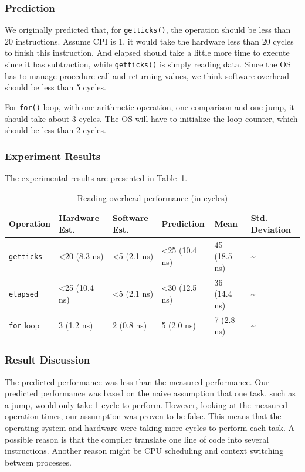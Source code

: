 \documentclass{article} %
\begin{document}
\subsubsection{Prediction}
We originally predicted that, for \texttt{getticks()}, the operation should be
less than 20 instructions. Assume CPI is 1, it would take the hardware less
than 20 cycles to finish this instruction. And elapsed should take a little
more time to execute since it has subtraction, while \texttt{getticks()} is
simply reading data. Since the OS has to manage procedure call and returning
values, we think software overhead should be less than 5 cycles.

For \texttt{for()} loop, with one arithmetic operation, one comparison and one
jump, it should take about 3 cycles. The OS will have to initialize the loop
counter, which should be less than 2 cycles.

\subsubsection{Experiment Results}

The experimental results are presented in Table~\ref{table:rdtsc_overhead}.

\begin{table}
  \caption{Reading overhead performance (in cycles)}
  \begin{tabular}{|l|l|l|l|l|l|}
    \hline
    Operation             & Hardware Est.         & Software Est.         & Prediction            & Mean          & Std. Deviation     \\ \hline
    \texttt{getticks}     & \textless20 (8.3 ns)  & \textless5 (2.1 ns)   & \textless25 (10.4 ns) & 45 (18.5 ns)  & \textasciitilde    \\ \hline
    \texttt{elapsed}      & \textless25 (10.4 ns) & \textless5 (2.1 ns)   & \textless30 (12.5 ns) & 36 (14.4 ns)  & \textasciitilde    \\ \hline
    \texttt{for} loop     & 3 (1.2 ns)            & 2 (0.8 ns)            & 5 (2.0 ns)            & 7 (2.8 ns)    & \textasciitilde    \\ \hline
  \end{tabular}
\label{table:rdtsc_overhead}
\end{table}
\subsubsection{Result Discussion}

The predicted performance was less than the measured performance. Our
predicted performance was based on the naive assumption that one task, such as
a jump, would only take 1 cycle to perform. However, looking at the measured
operation times, our assumption was proven to be false. This means that the
operating system and hardware were taking more cycles to perform each task.
A possible reason is that the compiler translate one line of code into several
instructions. Another reason might be CPU scheduling and context switching
between processes.
\end{document}
